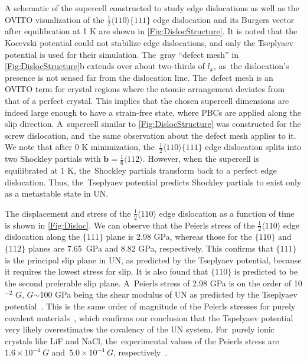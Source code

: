 \documentclass[applsci,article,accept,pdftex,moreauthors]{Definitions/mdpi}
\newcommand{\?}{\stackrel{?}{=}}
\begin{document}
A schematic of the supercell constructed to study edge dislocations as well as the OVITO visualization of the $\frac{1}{2} \langle 110 \rangle \{111\}$ edge dislocation and its Burgers vector after equilibration at 1 K are shown in \cref{Fig:DislocStructure}. It is noted that the Kocevski potential could not stabilize edge dislocations, and only the Tseplyaev potential is used for their simulation. The~gray ``defect mesh'' in \cref{Fig:DislocStructure}b extends over about two-thirds of $l_x$, as~the dislocation's presence is not sensed far from the dislocation line. The~defect mesh is an OVITO term for crystal regions where the atomic arrangement deviates from that of a perfect crystal. This implies that the chosen supercell dimensions are indeed large enough to have a strain-free state, where PBCs are applied along the slip direction. A~supercell similar to \cref{Fig:DislocStructure} was constructed for the screw dislocation, and~the same observation about the defect mesh applies to it. We note that after 0 K minimization, the~$\frac{1}{2} \langle 110 \rangle \{111\}$ edge dislocation splits into two Shockley partials with $\mathbf{b} = \frac{1}{6} \langle 112 \rangle$. However, when the supercell is equilibrated at 1 K, the~Shockley partials transform back to a perfect edge dislocation. Thus, the~Tseplyaev potential predicts Shockley partials to exist only as a metastable state in UN. %


The displacement and stress of the $\frac{1}{2} \langle 110 \rangle$ edge dislocation as a function of time is shown in \cref{Fig:Disloc}. We can observe that the Peierls stress of the $\frac{1}{2} \langle 110 \rangle$ edge dislocation along the $\{ 111 \}$ plane is 2.98 GPa, whereas those for the $\{ 110 \}$ and $\{ 112 \}$ planes are 7.65~GPa and 8.82 GPa, respectively. This confirms that $\{ 111 \}$ is the principal slip plane in UN, as predicted by the Tseplyaev potential, because it requires the lowest stress for slip. It is also found that  $\{ 110 \}$ is predicted to be the second preferable slip plane. A~Peierls stress of 2.98 GPa is on the order of 10$^{-2}$ $G$, $G$$\sim$100 GPa being the shear modulus of UN as predicted by the Tseplyaev potential~\cite{AbdulHameed2024}. This is the same order of magnitude of the Peierls stresses for purely covalent materials~\cite{Hull2011}, which confirms our conclusion that the Tspelyaev potential very likely overestimates the covalency of the UN system. For~purely ionic crystals like LiF and NaCl, the~experimental values of the Peierls stress are $1.6 \times 10^{-4}~G$ and~$5.0 \times 10^{-4}~G$, respectively~\cite{Liu2012}.
\end{document}

